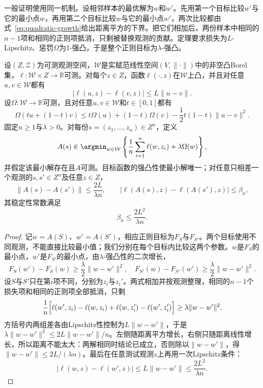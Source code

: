 一般证明使用同一机制。设相邻样本的最优解为$w$和$w'$。先用第一个目标比较$w'$与它的最小点$w$，再用第二个目标比较$w$与它的最小点$w'$，两次比较都由式~\eqref{eq:quadratic-growth}给出距离平方的下界。把它们相加后，两份样本中相同的$n-1$项和相同的正则项抵消，只剩被替换观测的贡献。定理要求损失为$L$-Lipschitz、惩罚$\Omega$为1-强凸，于是整个正则目标为$\lambda$-强凸。

\begin{theorem}[强凸正则化的稳定性]
\label{thm:regularized-erm-stability}
设$(Z,\mathcal Z)$为可测观测空间，$\mathcal W$是实赋范线性空间$(V,\|\cdot\|)$中的非空凸Borel集，$\ell:\mathcal W\times Z\to\mathbb R$可测。对每个$z\in Z$，函数$\ell(\cdot,z)$在$\mathcal W$上凸，并且对任意$u,v\in\mathcal W$都有
\[
 |\ell(u,z)-\ell(v,z)|\leq L\|u-v\|.
\]
设$\Omega:\mathcal W\to\mathbb R$可测，且对任意$u,v\in\mathcal W$和$t\in[0,1]$都有
\[
 \Omega(tu+(1-t)v)
 \leq t\Omega(u)+(1-t)\Omega(v)-\frac12t(1-t)\|u-v\|^2.
\]
固定$n\geq1$与$\lambda>0$。对每份$s=(z_1,\ldots,z_n)\in Z^n$，定义
\[
 A(s)\in\argmin_{w\in\mathcal W}
 \left\{\frac1n\sum_{i=1}^n\ell(w,z_i)+\lambda\Omega(w)\right\},
\]
并假定该最小解存在且$A$可测。目标函数的强凸性使最小解唯一；对任意只相差一个观测的$s,s'\in Z^n$及任意$z\in Z$，
\[
 \|A(s)-A(s')\|\leq\frac{2L}{\lambda n},\qquad
 |\ell(A(s),z)-\ell(A(s'),z)|\leq\beta_n,
\]
其稳定性常数满足
\begin{equation}
 \beta_n\leq\frac{2L^2}{\lambda n}.
 \label{eq:regularized-stability-bound}
\end{equation}
\end{theorem}

\begin{proof}
记$w=A(S)$、$w'=A(S')$，相应正则目标为$F_S$与$F_{S'}$。两个目标使用不同观测，不能直接比较最小值；我们分别在每个目标内比较这两个参数。$w$是$F_S$的最小点，$w'$是$F_{S'}$的最小点，由$\lambda$-强凸性的二次增长，
\begin{equation*}
 F_S(w')-F_S(w)\geq\frac\lambda2\|w-w'\|^2,
 \quad
 F_{S'}(w)-F_{S'}(w')\geq\frac\lambda2\|w-w'\|^2.
\end{equation*}
设$S$与$S'$只在第$i$项不同，分别为$z_i$与$z_i'$。两式相加并按观测整理，相同的$n-1$个损失项和相同的正则项全部抵消，只剩
\[
 \frac1n\Bigl[\ell(w',z_i)-\ell(w,z_i)+\ell(w,z_i')-\ell(w',z_i')\Bigr]
 \geq\lambda\|w-w'\|^2.
\]
方括号内两组差各由Lipschitz性控制为$L\|w-w'\|$，于是$\lambda\|w-w'\|^2\leq2L\|w-w'\|/n$。左侧随距离平方增长，右侧只随距离线性增长，所以距离不能太大：两解相同时结论已成立，否则除以$\|w-w'\|$，得$\|w-w'\|\leq2L/(\lambda n)$。最后在任意测试观测$z$上再用一次Lipschitz条件：
\[
 |\ell(w,z)-\ell(w',z)|\leq L\|w-w'\|\leq\frac{2L^2}{\lambda n}.
\]
\end{proof}

